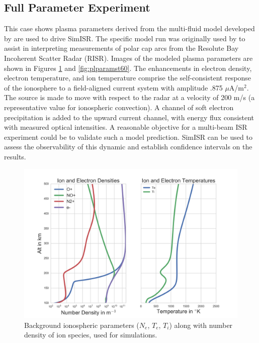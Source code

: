 \documentclass[draft,ras]{agutex}
\begin{document}
\begin{article}
\subsection{Full Parameter Experiment}
\label{sec:fullparam}
This case shows plasma parameters derived from the multi-fluid model developed by \cite{semeter:plasmatransport2012} are used to drive SimISR. The specific model run was originally used by \cite{Perry:2015jf} to assist in interpreting measurements of polar cap arcs from the Resolute Bay Incoherent Scatter Radar (RISR). Images of the modeled plasma parameters are shown in Figures \ref{fig:plparamst0} and \ref{fig:plparamst60}. The enhancements in electron density, electron temperature, and ion temperature comprise the self-consistent response of the ionosphere to a field-aligned current system with amplitude .875 $\mu$A/m$^2$.  The source is made to move with respect to the radar at a velocity of 200 m/s (a representative value for ionospheric convection).  A channel of soft electron precipitation is added to the upward current channel, with energy flux consistent with measured optical intensities.  A reasonable objective for a multi-beam ISR experiment could be to validate such a model prediction.  SimISR can be used to assess the observability of this dynamic and establish confidence intervals on the results.  

\begin{figure}[!t]
\centering
\includegraphics[width=6in]{backgroundallparams}
\caption{Background ionospheric parameters ($N_e$, $T_e$, $T_i$) along with number density of ion species, used for simulations.}
\label{fig:plparamst0}
\end{figure}


\end{article}
\end{document}
